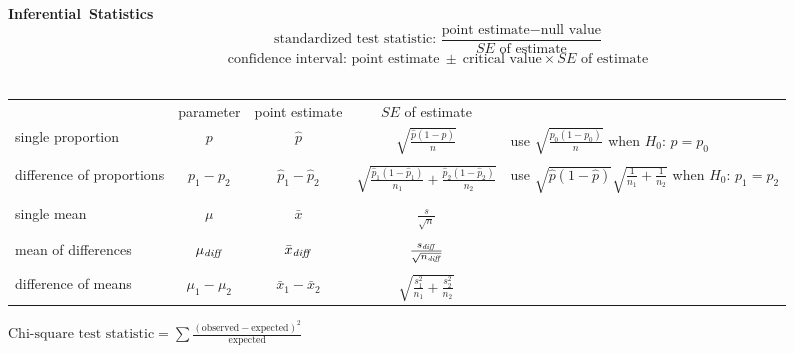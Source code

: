 \vspace{.2cm}
\textbf{Inferential~Statistics}
\\
$$\text{standardized test statistic: }  \frac{\text{point estimate} - \text{null value}}{SE \text{ of estimate}}$$
$$\text{confidence interval: } \text{point estimate} \ \pm \ \text{critical value}\times SE \text{ of estimate}$$
\\
\begin{center}
\begin{tabular}{lcccl}
&parameter & point estimate &$SE$  of estimate& \\
single proportion &$p$ &$\hat{p}$ &$\sqrt{\frac{\hat{p}(1-\hat{p})}{n}}$ & use $\sqrt{\frac{p_0(1-p_0)}{n}}$ when $H_0$: $p=p_0$\\
\\
difference of proportions & $p_1-p_2$ & $\hat{p}_1-\hat{p}_2$ & $\sqrt{\frac{\hat{p}_1(1-\hat{p}_1)}{n_1}+\frac{\hat{p}_2(1-\hat{p}_2)}{n_2}}$ & use $\sqrt{\hat{p}(1-\hat{p})}\sqrt{\frac{1}{n_1}+\frac{1}{n_2}}$ when $H_0$: $p_1=p_2$ \\
\\
single mean & $\mu$ & $\bar{x}$ & $\frac{s}{\sqrt{n}}$&\quad  \\
\\
mean of differences& $\mu_{\text{\emph{diff}}}$ & $\bar{x}_{\text{\emph{diff}}}$ & $\frac{s_{\text{\emph{diff}}}}{\sqrt{n_{\text{\emph{diff}}}}}$&\quad  \\
\\
difference of means & $\mu_1-\mu_2$ & $\bar{x}_1-\bar{x}_2$ & $\sqrt{\frac{s^2_1}{n_1}+\frac{s^2_2}{n_2}}$&
\end{tabular}
\end{center}
\vspace{1cm}
\qquad $\text{Chi-square test statistic} = \sum{\frac{(\text{observed} - \text{expected})^2}{\text{expected}}}$
\restoregeometry